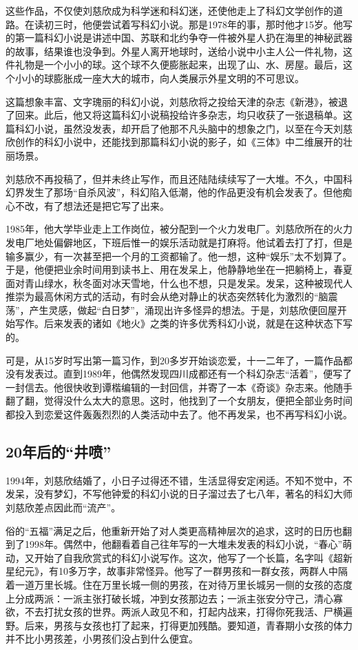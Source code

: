 \documentclass[fontset=fandol,12pt,a5paper]{ctexbook}
\begin{document}
这些作品，不仅使刘慈欣成为科学迷和科幻迷，还使他走上了科幻文学创作的道路。在读初三时，他便尝试着写科幻小说。那是1978年的事，那时他才15岁。他写的第一篇科幻小说是讲述中国、苏联和北约争夺一件被外星人扔在海里的神秘武器的故事，结果谁也没争到。外星人离开地球时，送给小说中小主人公一件礼物，这件礼物是一个小小的球。这个球不久便膨胀起来，出现了山、水、房屋。最后，这个小小的球膨胀成一座大大的城市，向人类展示外星文明的不可思议。

这篇想象丰富、文字瑰丽的科幻小说，刘慈欣将之投给天津的杂志《新港》，被退了回来。此后，他又将这篇科幻小说稿投给许多杂志，均只收获了一张退稿单。这篇科幻小说，虽然没发表，却开启了他那不凡头脑中的想象之门，以至在今天刘慈欣创作的科幻小说中，还能找到那篇科幻小说的影子，如《三体》中二维展开的壮丽场景。

刘慈欣不再投稿了，但并未终止写作，而且还陆陆续续写了一大堆。不久，中国科幻界发生了那场“自杀风波”，科幻陷入低潮，他的作品更没有机会发表了。但他痴心不改，有了想法还是把它写了出来。

1985年，他大学毕业走上工作岗位，被分配到一个火力发电厂。刘慈欣所在的火力发电厂地处偏僻地区，下班后惟一的娱乐活动就是打麻将。他试着去打了打，但是输多赢少，有一次甚至把一个月的工资都输了。他一想，这种“娱乐”太不划算了。于是，他便把业余时间用到读书上、用在发呆上，他静静地坐在一把躺椅上，春夏面对青山绿水，秋冬面对冰天雪地，什么也不想，只是发呆。发呆，这种被现代人推崇为最高休闲方式的活动，有时会从绝对静止的状态突然转化为激烈的“脑震荡”，产生灵感，做起“白日梦”，涌现出许多怪异的想法。于是，刘慈欣便回屋开始写作。后来发表的诸如《地火》之类的许多优秀科幻小说，就是在这种状态下写的。

可是，从15岁时写出第一篇习作，到20多岁开始谈恋爱，十一二年了，一篇作品都没有发表过。直到1989年，他偶然发现四川成都还有一个科幻杂志“活着”，便写了一封信去。他很快收到谭楷编辑的一封回信，并寄了一本《奇谈》杂志来。他随手翻了翻，觉得没什么太大的意思。这时，他找到了一个女朋友，便把全部业务时间都投入到恋爱这件轰轰烈烈的人类活动中去了。他不再发呆，也不再写科幻小说。

\subsection{20年后的“井喷”}

1994年，刘慈欣结婚了，小日子过得还不错，生活显得安定闲适。不知不觉中，不发呆，没有梦幻，不写他钟爱的科幻小说的日子溜过去了七八年，著名的科幻大师刘慈欣差点因此而“流产”。

俗的“五福”满足之后，他重新开始了对人类更高精神层次的追求，这时的日历也翻到了1998年。偶然中，他翻看着自己往年写的一大堆未发表的科幻小说，“春心”萌动，又开始了自我欣赏式的科幻小说写作。这次，他写了一个长篇，名字叫《超新星纪元》，有10多万字，故事非常怪异。他写了一群男孩和一群女孩，两群人中隔着一道万里长城。住在万里长城一侧的男孩，在对待万里长城另一侧的女孩的态度上分成两派：一派主张打破长城，冲到女孩那边去；一派主张安分守己，清心寡欲，不去打扰女孩的世界。两派人政见不和，打起内战来，打得你死我活、尸横遍野。后来，男孩与女孩也打了起来，打得更加残酷。要知道，青春期小女孩的体力并不比小男孩差，小男孩们没占到什么便宜。
\end{document}
